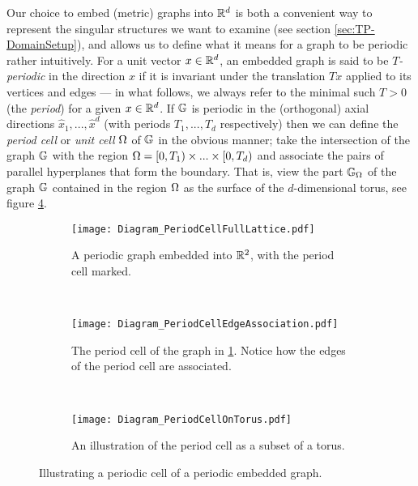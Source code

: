 Our choice to embed (metric) graphs into $\mathbb{R}^d$ is both a convenient way to represent the singular structures we want to examine (see section \ref{sec:TP-DomainSetup}), and allows us to define what it means for a graph to be periodic rather intuitively.
For a unit vector $x\in\mathbb{R}^d$, an embedded graph is said to be \emph{$T$-periodic} in the direction $x$ if it is invariant under the translation $Tx$ applied to its vertices and edges --- in what follows, we always refer to the minimal such $T>0$ (the \emph{period}) for a given $x\in\mathbb{R}^d$.
If $\mathbb{G}$ is periodic in the (orthogonal) axial directions $\widehat{x}_1, ..., \widehat{x}^d$ (with periods $T_1, ..., T_d$ respectively) then we can define the \emph{period cell} or \emph{unit cell} $\Omega$ of $\mathbb{G}$ in the obvious manner; take the intersection of the graph $\mathbb{G}$ with the region $\Omega = [0,T_1)\times ...\times [0,T_d)$ and associate the pairs of parallel hyperplanes that form the boundary.
That is, view the part $\mathbb{G}_{\Omega}$ of the graph $\mathbb{G}$ contained in the region $\Omega$ as the surface of the $d$-dimensional torus, see figure \ref{fig:PeriodCellIllustration}.
\begin{figure}[t!]
	\centering
	\begin{subfigure}[t]{0.45\textwidth}
		\centering
		\texttt{[image: Diagram\_PeriodCellFullLattice.pdf]}
		\caption[]{\label{fig:Diagram_PeriodCellFullLattice} A periodic graph embedded into $\reals^2$, with the period cell marked.}
	\end{subfigure}
	~
	\begin{subfigure}[t]{0.45\textwidth}
		\centering
		\texttt{[image: Diagram\_PeriodCellEdgeAssociation.pdf]}
		\caption[]{\label{fig:Diagram_PeriodCellEdgeAssociation} The period cell of the graph in \ref{fig:Diagram_PeriodCellFullLattice}. Notice how the edges of the period cell are associated.}
	\end{subfigure}
	\\
	\begin{subfigure}[b]{0.75\textwidth}
		\centering
		\texttt{[image: Diagram\_PeriodCellOnTorus.pdf]}
		\caption[]{\label{fig:Diagram_PeriodCellOnTorus} An illustration of the period cell as a subset of a torus.}
	\end{subfigure}
	\caption[The period cell of a periodic graph embedded in $\reals^2$; viewed as a subregion of $\reals^2$, and on the torus.]{\label{fig:PeriodCellIllustration} Illustrating a periodic cell of a periodic embedded graph.}
\end{figure} 
